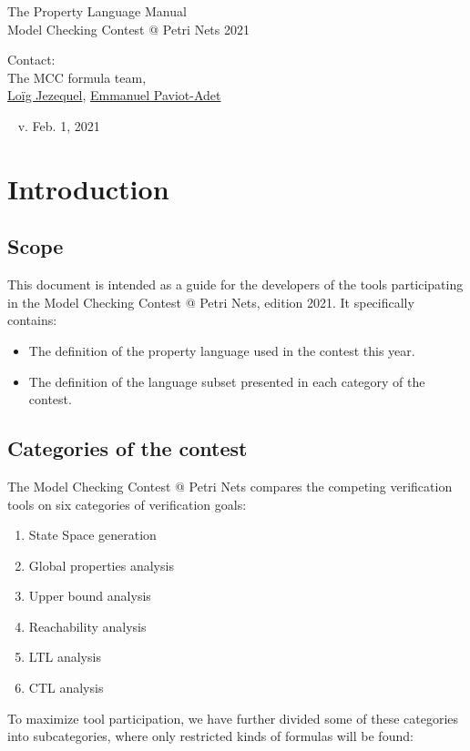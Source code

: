 \documentclass[10pt,english,a4paper]{article}
\makeatletter
\newcommand{\mcc}[0]{MCC}
\newcommand{\mccl}[0]{Model Checking Contest @ Petri Nets}
\newcommand\mysection[1]{\color{sectioncolor}\section{#1}\color{defaultcolor}}
\newcommand\mysubsection[1]{\color{sectioncolor}\subsection{#1}\color{defaultcolor}}
\makeatother
\begin{document}
\color{defaultcolor}

\vspace*{5cm}
\Huge
The Property Language Manual \\[10pt]
\Large
Model Checking Contest @ Petri Nets 2021

\vspace{3cm}
\large
Contact: \\[15pt]
The \mcc{} formula team, \\
\href{mailto:loig.jezequel@univ-nantes.fr}{Loïg Jezequel},
\href{mailto:emmanuel.paviot-adet@lip6.fr}{Emmanuel Paviot-Adet}
\vspace{2cm}

\vfill
~
\hfill
\scriptsize
v\@. Feb\@. 1, 2021
\normalsize

\clearpage
\tableofcontents

\clearpage
\mysection{Introduction}

\mysubsection{Scope}

This document is intended as a guide for the developers of
the tools participating in the \mccl{}, edition 2021.
It specifically contains:

\begin{itemize}
\item
  The definition of the property language used in the contest this year.
\item
  The definition of the language subset presented in each category of the
  contest.
\end{itemize}

\mysubsection{Categories of the contest}

The \mccl{} compares the competing verification tools on six
categories of verification goals:

\begin{enumerate}
\item State Space generation
\item Global properties analysis
\item Upper bound analysis
\item Reachability analysis
\item LTL analysis
\item CTL analysis
\end{enumerate}

To maximize tool participation, we have further divided some of these categories
into subcategories, where only restricted kinds of formulas
will be found:
\end{document}
